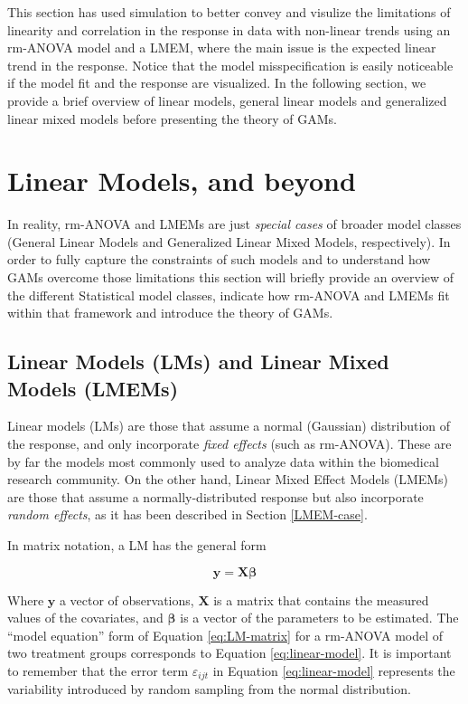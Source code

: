 \documentclass[
]{article}
\begin{document}
This section has used simulation to better convey and visulize the limitations of linearity and correlation in the response in data with non-linear trends using an rm-ANOVA model and a LMEM, where the main issue is the expected linear trend in the response. Notice that the model misspecification is easily noticeable if the model fit and the response are visualized. In the following section, we provide a brief overview of linear models, general linear models and generalized linear mixed models before presenting the theory of GAMs.

\hypertarget{linear-models-and-beyond}{%
\section{Linear Models, and beyond}\label{linear-models-and-beyond}}

In reality, rm-ANOVA and LMEMs are just \emph{special cases} of broader model classes (General Linear Models and Generalized Linear Mixed Models, respectively). In order to fully capture the constraints of such models and to understand how GAMs overcome those limitations this section will briefly provide an overview of the different Statistical model classes, indicate how rm-ANOVA and LMEMs fit within that framework and introduce the theory of GAMs.

\hypertarget{linear-models-lms-and-linear-mixed-models-lmems}{%
\subsection{Linear Models (LMs) and Linear Mixed Models (LMEMs)}\label{linear-models-lms-and-linear-mixed-models-lmems}}

Linear models (LMs) are those that assume a normal (Gaussian) distribution of the response, and only incorporate \emph{fixed effects} (such as rm-ANOVA). These are by far the models most commonly used to analyze data within the biomedical research community. On the other hand, Linear Mixed Effect Models (LMEMs) are those that assume a normally-distributed response but also incorporate \emph{random effects}, as it has been described in Section \ref{LMEM-case}.

In matrix notation, a LM has the general form

\begin{equation}
\textbf{y} = \textbf{X} \boldsymbol{\beta}
\label{eq:LM-matrix}
\end{equation}

Where \(\textbf{y}\) a vector of observations, \(\textbf{X}\) is a matrix that contains the measured values of the covariates, and \(\boldsymbol{\beta}\) is a vector of the parameters to be estimated. The ``model equation'' form of Equation \eqref{eq:LM-matrix} for a rm-ANOVA model of two treatment groups corresponds to Equation \eqref{eq:linear-model}. It is important to remember that the error term \(\varepsilon_{ijt}\) in Equation \eqref{eq:linear-model} represents the variability introduced by random sampling from the normal distribution.
\end{document}
